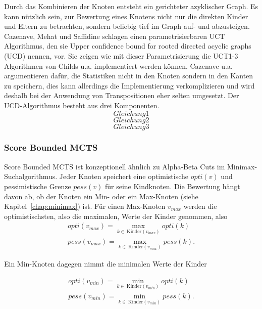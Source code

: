Durch das Kombinieren der Knoten entsteht ein gerichteter azyklischer Graph. Es kann nützlich sein, zur Bewertung eines Knotens nicht nur die direkten Kinder und Eltern zu betrachten, sondern beliebig tief im Graph auf- und abzusteigen. Cazenave, Mehat und Saffidine schlagen einen parametrisierbaren UCT Algorithmus, den sie Upper confidence bound for rooted directed acyclic graphs (UCD) nennen, vor. Sie zeigen wie mit dieser Parametrisierung die UCT1-3 Algorithmen von Childs u.a. implementiert werden können. Cazenave u.a. argumentieren dafür, die Statistiken nicht in den Knoten sondern in den Kanten zu speichern, dies kann allerdings die Implementierung verkomplizieren und wird deshalb bei der Anwendung von Transpositionen eher selten umgesetzt.
Der UCD-Algorithmus besteht aus drei Komponenten.
\begin{equation}
Gleichung1
\label{eqn:ucd1}
\end{equation}
\begin{equation}
Gleichung2
\label{eqn:ucd2}
\end{equation}
\begin{equation}
Gleichung3
\label{eqn:ucd3}
\end{equation}


\subsubsection{Score Bounded MCTS}
\label{chap:scorebounded}
Score Bounded MCTS ist konzeptionell ähnlich zu Alpha-Beta Cuts im Minimax-Such\-al\-gorithmus.
Jeder Knoten speichert eine optimistische $opti(v)$ und pessimistische Grenze $pess(v)$ für seine Kindknoten.
Die Bewertung hängt davon ab, ob der Knoten ein Min- oder ein Max-Knoten (siehe Kapitel~\ref{chap:minimax}) ist.
Für einen Max-Knoten $v_{max}$ werden die optimistischsten, also die maximalen, Werte der Kinder genommen, also
\begin{equation}
\begin{split}
opti(v_{max}) = \max_{k \in\ \text{Kinder}(v_{max})}opti(k)\\
pess(v_{max}) = \max_{k \in\ \text{Kinder}(v_{max})}pess(k).
\end{split}
\end{equation}

Ein Min-Knoten dagegen nimmt die minimalen Werte der Kinder 

\begin{equation}
\begin{split}
opti(v_{min}) = \min_{k \in\ \text{Kinder}(v_{min})}opti(k)\\
pess(v_{min}) = \min_{k \in\ \text{Kinder}(v_{min})}pess(k).
\end{split}
\end{equation}


